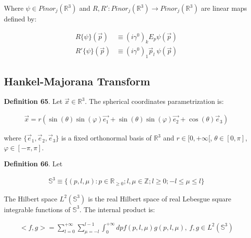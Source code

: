 \documentclass[11pt]{book}
\begin{document}
Where \(\psi\in Pinor_j(\mathbb{R}^3)\) and
\(R,R':Pinor_j(\mathbb{R}^3)\to Pinor_j(\mathbb{R}^3)\) are linear maps
defined by:

\begin{equation}\begin{aligned}
R\{\psi\}(\vec{p})&\equiv (i\gamma^0)_k E_p \psi(\vec{p})\\
R'\{\psi\}(\vec{p})&\equiv (i\gamma^0)_1\vec{p}_l\ \psi(\vec{p})\end{aligned}\end{equation}

\hypertarget{hankel-majorana-transform}{%
\subsection{Hankel-Majorana Transform}\label{hankel-majorana-transform}}

\textbf{Definition 65}. Let \(\vec{x}\in \mathbb{R}^3\). The spherical
coordinates parametrization is:

\begin{equation}\begin{aligned}
\vec{x}=r(\sin(\theta)\sin(\varphi)\vec{e_1}+\sin(\theta)\sin(\varphi)\vec{e_2}+\cos(\theta)\vec{e}_3)\end{aligned}\end{equation}

where \(\{\vec{e}_1,\vec{e}_2,\vec{e}_3\}\) is a fixed orthonormal basis
of \(\mathbb{R}^3\) and \(r\in [0,+\infty[\), \(\theta \in [0,\pi]\),
\(\varphi
\in [-\pi,\pi]\).

\textbf{Definition 66}. Let

\begin{equation}\begin{aligned}
\mathbb{S}^3\equiv \{(p,l,\mu):p\in \mathbb{R}_{\geq 0}; 
l,\mu \in \mathbb{Z}; l\geq 0; -l \leq \mu\leq l\}\end{aligned}\end{equation}

The Hilbert space \(L^2(\mathbb{S}^3)\) is the real Hilbert space of
real Lebesgue square integrable functions of \(\mathbb{S}^3\). The
internal product is:

\begin{equation}\begin{aligned}
<f,g>=\sum_{l=0}^{+\infty}\sum_{\mu=-l}^{l-1}\int_0^{+\infty} dp f(p,l,\mu)
g(p,l,\mu),\ f,g\in L^2(\mathbb{S}^3)\end{aligned}\end{equation}
\end{document}

